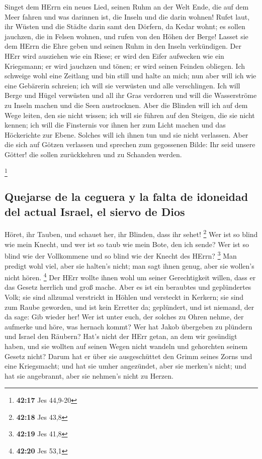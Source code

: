  Singet dem HErrn ein neues Lied, seinen Ruhm an der Welt
Ende, die auf dem Meer fahren und was darinnen ist, die Inseln und die
darin wohnen!  Rufet laut, ihr Wüsten und die Städte
darin samt den Dörfern, da Kedar wohnt; es sollen jauchzen, die in
Felsen wohnen, und rufen von den Höhen der Berge!  Lasset
sie dem HErrn die Ehre geben und seinen Ruhm in den Inseln verkündigen.
 Der HErr wird ausziehen wie ein Riese; er wird den Eifer
aufwecken wie ein Kriegsmann; er wird jauchzen und tönen; er wird seinen
Feinden obliegen.  Ich schweige wohl eine Zeitlang und
bin still und halte an mich; nun aber will ich wie eine Gebärerin
schreien; ich will sie verwüsten und alle verschlingen. 
Ich will Berge und Hügel verwüsten und all ihr Gras verdorren und will
die Wasserströme zu Inseln machen und die Seen austrocknen.
 Aber die Blinden will ich auf dem Wege leiten, den sie
nicht wissen; ich will sie führen auf den Steigen, die sie nicht kennen;
ich will die Finsternis vor ihnen her zum Licht machen und das
Höckerichte zur Ebene. Solches will ich ihnen tun und sie nicht
verlassen.  Aber die sich auf Götzen verlassen und
sprechen zum gegossenen Bilde: Ihr seid unsere Götter! die sollen
zurückkehren und zu Schanden werden.

\footnote{\textbf{42:17} Jes 44,9-20}

\hypertarget{quejarse-de-la-ceguera-y-la-falta-de-idoneidad-del-actual-israel-el-siervo-de-dios}{%
\subsection{Quejarse de la ceguera y la falta de idoneidad del actual
Israel, el siervo de
Dios}\label{quejarse-de-la-ceguera-y-la-falta-de-idoneidad-del-actual-israel-el-siervo-de-dios}}

 Höret, ihr Tauben, und schauet her, ihr Blinden, dass
ihr sehet! \footnote{\textbf{42:18} Jes 43,8}  Wer ist so
blind wie mein Knecht, und wer ist so taub wie mein Bote, den ich sende?
Wer ist so blind wie der Vollkommene und so blind wie der Knecht des
HErrn? \footnote{\textbf{42:19} Jes 41,8}  Man predigt
wohl viel, aber sie halten's nicht; man sagt ihnen genug, aber sie
wollen's nicht hören. \footnote{\textbf{42:20} Jes 53,1} 
Der HErr wollte ihnen wohl um seiner Gerechtigkeit willen, dass er das
Gesetz herrlich und groß mache.  Aber es ist ein
beraubtes und geplündertes Volk; sie sind allzumal verstrickt in Höhlen
und versteckt in Kerkern; sie sind zum Raube geworden, und ist kein
Erretter da; geplündert, und ist niemand, der da sage: Gib wieder her!
 Wer ist unter euch, der solches zu Ohren nehme, der
aufmerke und höre, was hernach kommt?  Wer hat Jakob
übergeben zu plündern und Israel den Räubern? Hat's nicht der HErr
getan, an dem wir gesündigt haben, und sie wollten auf seinen Wegen
nicht wandeln und gehorchten seinem Gesetz nicht?  Darum
hat er über sie ausgeschüttet den Grimm seines Zorns und eine
Kriegsmacht; und hat sie umher angezündet, aber sie merken's nicht; und
hat sie angebrannt, aber sie nehmen's nicht zu Herzen.

